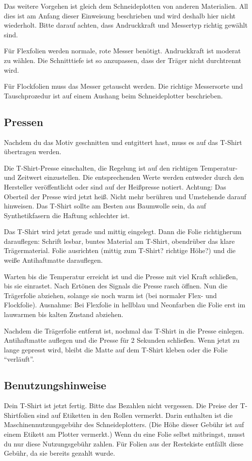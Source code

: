 \documentclass{\basedir/fablab-document}
\begin{document}
Das weitere Vorgehen ist gleich dem Schneideplotten von anderen Materialien.
All dies ist am Anfang dieser Einweisung beschrieben und wird deshalb hier nicht wiederholt.
Bitte darauf achten, dass Andruckkraft und Messertyp richtig gewählt sind.

Für Flexfolien werden normale, rote Messer benötigt.
Andruckkraft ist moderat zu wählen.
Die Schnitttiefe ist so anzupassen, dass der Träger nicht durchtrennt wird.

Für Flockfolien muss das Messer getauscht werden.
Die richtige Messersorte und Tauschprozedur ist auf einem Aushang beim Schneideplotter beschrieben.

\subsection{Pressen}
Nachdem du das Motiv geschnitten und entgittert hast, muss es auf das T-Shirt übertragen werden.

Die T-Shirt-Presse einschalten, die Regelung ist auf den richtigen Temperatur- und Zeitwert einzustellen.
Die entsprechenden Werte werden entweder durch den Hersteller veröffentlicht oder sind auf der Heißpresse notiert.
Achtung: Das Oberteil der Presse wird jetzt heiß.
Nicht mehr berühren und Umstehende darauf hinweisen.
Das T-Shirt sollte am Besten aus Baumwolle sein, da auf Synthetikfasern die Haftung schlechter ist.

Das T-Shirt wird jetzt gerade und mittig eingelegt.
Dann die Folie richtigherum darauflegen: Schrift lesbar, buntes Material am T-Shirt, obendrüber das klare Trägermaterial.
Folie ausrichten (mittig zum T-Shirt? richtige Höhe?) und die weiße Antihaftmatte darauflegen.

Warten bis die Temperatur erreicht ist und die Presse mit viel Kraft schließen, bis sie einrastet.
Nach Ertönen des Signals die Presse rasch öffnen.
Nun die Trägerfolie abziehen, solange sie noch warm ist (bei normaler Flex- und Flockfolie).
Ausnahme: Bei Flexfolie in hellblau und Neonfarben die Folie erst im lauwarmen bis kalten Zustand abziehen.

Nachdem die Trägerfolie entfernt ist, nochmal das T-Shirt in die Presse einlegen.
Antihaftmatte auflegen und die Presse für 2 Sekunden schließen.
Wenn jetzt zu lange gepresst wird, bleibt die Matte auf dem T-Shirt kleben oder die Folie \enquote{verläuft}.

\subsection{Benutzungshinweise}
Dein T-Shirt ist jetzt fertig.
Bitte das Bezahlen nicht vergessen.
Die Preise der T-Shirtfolien sind auf Etiketten in den Rollen vermerkt.
Darin enthalten ist die Maschinennutzungsgebühr des Schneideplotters.
(Die Höhe dieser Gebühr ist auf einem Etikett am Plotter vermerkt.)
Wenn du eine Folie selbst mitbringst, musst du nur diese Nutzungsgebühr zahlen.
Für Folien aus der Restekiste entfällt diese Gebühr, da sie bereits gezahlt wurde.
\end{document}
